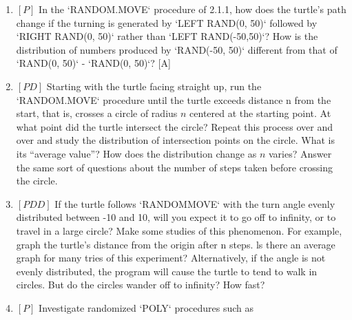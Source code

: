 \documentclass{book}
\begin{document}
\begin{enumerate}
\item $[P]$ In the \textsc{`RANDOM.MOVE`} procedure of 2.1.1, how does the turtle's
path change if the turning is generated by \textsc{`LEFT RAND(0, 50)`} followed
by \textsc{`RIGHT RAND(0, 50)`} rather than \textsc{`LEFT RAND(-50,50)`}? How is the
distribution of numbers produced by \textsc{`RAND(-50, 50)`} different from that
of \textsc{`RAND(0, 50)`} - \textsc{`RAND(0, 50)`}? [A]
\item $[PD]$ Starting with the turtle facing straight up, run the \textsc{`RANDOM.MOVE`}
procedure until the turtle exceeds distance n from the start, that is,
crosses a circle of radius $n$ centered at the starting point. At what point
did the turtle intersect the circle? Repeat this process over and over
and study the distribution of intersection points on the circle. What
is its ``average value''? How does the distribution change as $n$ varies?
Answer the same sort of questions about the number of steps taken
before crossing the circle.  
\item $[PDD]$ If the turtle follows \textsc{`RANDOMMOVE`} with the turn angle evenly 
distributed between -10 and 10, will you expect it to go off to infinity,
or to travel in a large circle? Make some studies of this phenomenon.
For example, graph the turtle's distance from the origin after n steps. ls
there an average graph for many tries of this experiment? Alternatively,
if the angle is not evenly distributed, the program will cause the turtle
to tend to walk in circles. But do the circles wander off to infinity? How
fast?
\item $[P]$ Investigate randomized \textsc{`POLY`} procedures such as


\end{enumerate}
\end{document}
